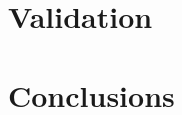 \documentclass{SmartReport}
\begin{document}
\section{Validation}
\label{sec:val}

\newpage


\section{Conclusions}
\label{sec:concl}

\newpage



% 
\end{document}
